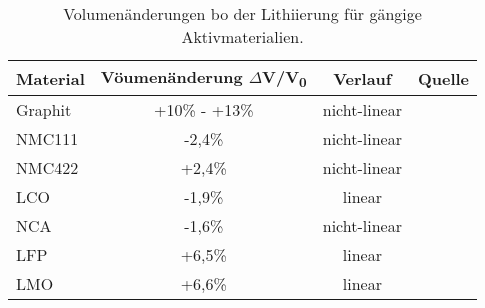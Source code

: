 \begin{table}[ht]
    \centering
    \caption{Volumenänderungen bo der Lithiierung für gängige Aktivmaterialien.}
    \begin{tabular}[t]{lccc}
        \toprule
        Material& Vöumenänderung $\Delta$V/V\textsubscript{0}&Verlauf&Quelle\\
        \midrule
        Graphit & +10\% - +13\% & nicht-linear & \cite{Qi2010,Woodford2012}\\
        NMC111 &-2,4\%&nicht-linear& \cite{Yabuuchi2005}\\
        NMC422 &+2,4\%&nicht-linear& \cite{Ma2007}\\
        LCO &-1,9\% & linear & \cite{Reimers1992}\\
        NCA &-1,6\% & nicht-linear& \cite{Itou2005}\\
        LFP &+6,5\% & linear & \cite{Padhi1997}\\
        LMO &+6,6\% & linear & \cite{Christensen2006}\\
        \bottomrule
    \end{tabular}
\end{table}